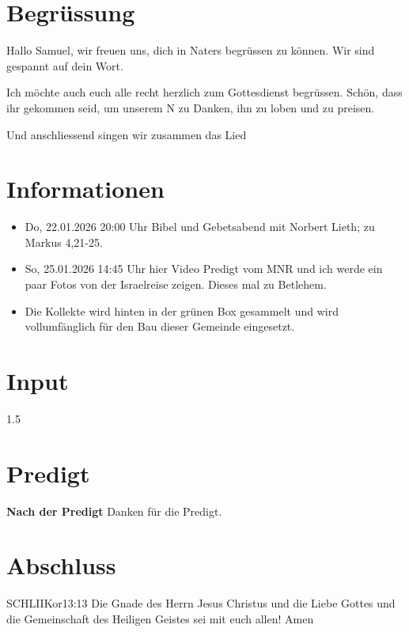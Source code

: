 \documentclass[fontsize=14pt]{mybib}
\newcommand{\Name}{Samuel}
\begin{document}
\section{Begrüssung}
Hallo \Name{}, wir freuen uns, dich in Naters begrüssen zu können. Wir sind gespannt auf dein Wort.

Ich möchte auch euch alle recht herzlich zum Gottesdienst begrüssen. Schön, dass ihr gekommen seid, um unserem \herr N zu Danken, ihn zu loben und zu preisen.

\beten{} Und anschliessend singen wir zusammen das Lied



\section{Informationen}
\begin{itemize}
    \item {} Do, 22.01.2026 20:00 Uhr Bibel und Gebetsabend mit Norbert Lieth; zu Markus 4,21-25.
    \item {} So, 25.01.2026 14:45 Uhr hier Video Predigt vom MNR und ich werde ein paar Fotos von der Israelreise zeigen. Dieses mal zu Betlehem. 
    \item {} Die Kollekte wird hinten in der grünen Box gesammelt und wird vollumfänglich für den Bau dieser Gemeinde eingesetzt.
\end{itemize}

\section{ Input }
\begin{spacing}{1.5}
    
   
\end{spacing}

\section{Predigt}
\textbf{Nach der Predigt}\newline
Danken für die Predigt.\newline

\section{Abschluss}


\beten{}

\begin{bibelbox}{SCHL}{IIKor}{13:13}
    Die Gnade des Herrn Jesus Christus und die Liebe Gottes und die Gemeinschaft des Heiligen Geistes sei mit euch allen! Amen
\end{bibelbox}
\end{document}
